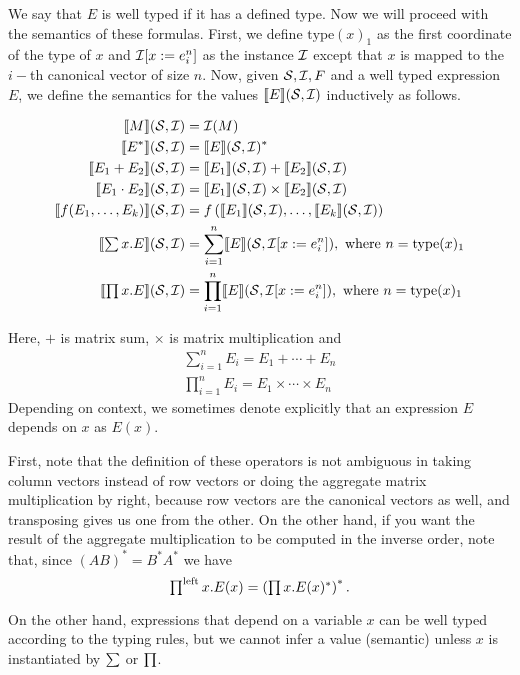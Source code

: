 We say that $E$ is well typed if it has a defined type. Now we will proceed with the semantics of these formulas.
First, we define $\text{type}(x)_1$ as the first coordinate of the type of $x$ and $\mathcal{I}[x:= e^n_i]$ as the instance $\mathcal{I}$ except that $x$ is mapped to the $i-$th canonical vector of size $n$.
Now, given $\mathcal{S}, \mathcal{I}, F$ and a well typed expression $E$, we define the semantics for the values $\llbracket E \rrbracket(\mathcal{S},\mathcal{I})$ inductively as follows.

\begin{align*}
\llbracket M \rrbracket(\mathcal{S},\mathcal{I})&=\mathcal{I} (M) \\
\llbracket E^* \rrbracket(\mathcal{S},\mathcal{I})&=\llbracket E \rrbracket(\mathcal{S},\mathcal{I})^* \\
\llbracket E_1+E_2 \rrbracket(\mathcal{S},\mathcal{I})&= \llbracket E_1 \rrbracket(\mathcal{S},\mathcal{I})+\llbracket E_2 \rrbracket(\mathcal{S},\mathcal{I})\\
\llbracket E_1\cdot E_2 \rrbracket(\mathcal{S},\mathcal{I})&= \llbracket E_1 \rrbracket(\mathcal{S},\mathcal{I})\times \llbracket E_2 \rrbracket(\mathcal{S},\mathcal{I})\\
\llbracket f(E_1,\ldots ,E_k) \rrbracket(\mathcal{S},\mathcal{I}) &= f\left(\llbracket E_1 \rrbracket(\mathcal{S},\mathcal{I}),\ldots , \llbracket E_k \rrbracket(\mathcal{S},\mathcal{I})\right)\\
\llbracket \textstyle\sum x.E \rrbracket(\mathcal{S},\mathcal{I})&= \sum_{i=1}^{n}\llbracket E \rrbracket(\mathcal{S},\mathcal{I}[x:= e^n_i]),\text{ where }n=\text{type}(x)_1\\
\llbracket \textstyle\prod x. E \rrbracket(\mathcal{S},\mathcal{I})&= \prod_{i=1}^{n}\llbracket E \rrbracket(\mathcal{S},\mathcal{I}[x:= e^n_i]),\text{ where }n=\text{type}(x)_1
\end{align*}

Here, $+$ is matrix sum, $\times$ is matrix multiplication and 
\begin{align*}
\sum_{i=1}^n E_i = E_1+\cdots + E_n \\
\prod_{i=1}^n E_i = E_1\times \cdots\times E_n
\end{align*}
Depending on context, we sometimes denote explicitly that an expression $E$ depends on $x$ as $E(x)$.

First, note that the definition of these operators is not ambiguous in taking column vectors instead of row vectors or doing the aggregate matrix multiplication by right, because row vectors are the canonical vectors as well, and transposing gives us one from the other. On the other hand, if you want the result of the aggregate multiplication to be computed in the inverse order, note that, since $(AB)^*=B^*A^*$ we have $$\textstyle\prod^{\text{left}} x.E(x)=\left(\textstyle\prod x.E(x)^*\right)^*.$$

On the other hand, expressions that depend on a variable $x$ can be well typed according to the typing rules, but we cannot infer a value (semantic) unless $x$ is instantiated by $\textstyle\sum$ or $\textstyle\prod$.


